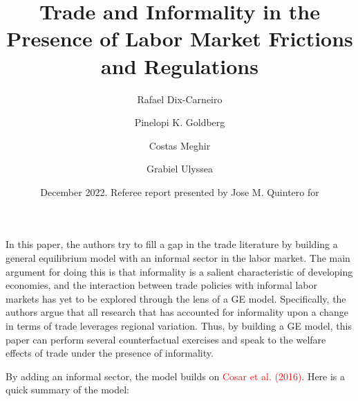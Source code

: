 \documentclass[12pt,oneside,reqno]{amsart}
\title{Trade and Informality in the Presence of Labor Market Frictions and Regulations}
\author{Rafael Dix-Carneiro \and Pinelopi K. Goldberg \and Costas Meghir \and Grabiel Ulyssea}
\date{December 2022. Referee report presented by Jose M. Quintero for}
\begin{document}
\maketitle 

In this paper, the authors try to fill a gap in the trade literature by building a general equilibrium model with an informal sector in the labor market. The main argument for doing this is that informality is a salient characteristic of developing economies, and the interaction between trade policies with informal labor markets has yet to be explored through the lens of a GE model. Specifically, the authors argue that all research that has accounted for informality upon a change in terms of trade leverages regional variation. Thus, by building a GE model, this paper can perform several counterfactual exercises and speak to the welfare effects of trade under the presence of informality. 

By adding an informal sector, the model builds on \textcolor{red}{Cosar et al. (2016)}. Here is a quick summary of the model:
\end{document}
